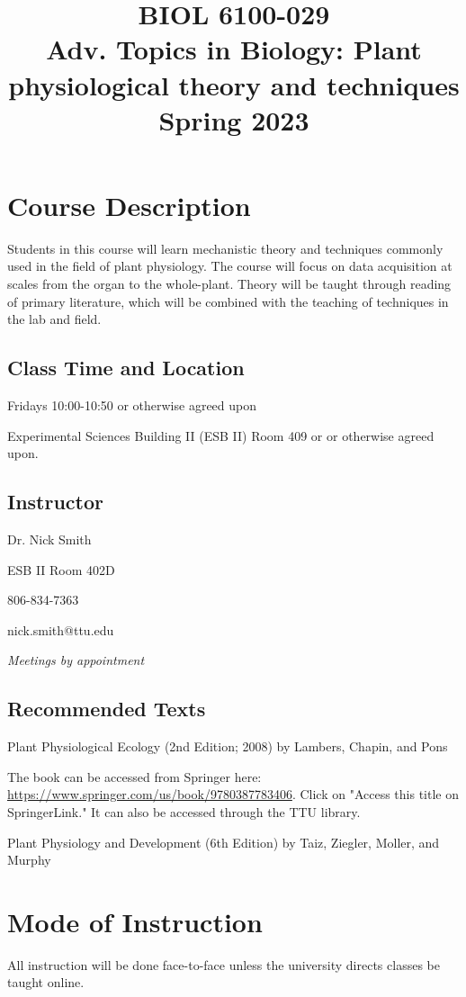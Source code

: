 \documentclass[12pt, notitlepage]{article}   	%
\title{
	\textbf{
		BIOL 6100-029
	} \\
	\large Adv. Topics in Biology: Plant physiological theory and techniques \\
	\large Spring 2023
}
\date{\vspace{-5ex}}
\begin{document}
{\selectfont %

\maketitle

\section{Course Description}
Students in this course will learn mechanistic theory and techniques commonly used in
the field of plant physiology. The course will focus on data acquisition at scales from
the organ to the whole-plant. Theory will be taught through reading of primary literature,
which will be combined with the teaching of techniques in the lab and field.

\subsection{Class Time and Location}
Fridays 10:00-10:50 or otherwise agreed upon

Experimental Sciences Building II (ESB II) Room 409 or 
or otherwise agreed upon.

\subsection{Instructor}
Dr. Nick Smith \par
ESB II Room 402D \par
806-834-7363 \par
nick.smith@ttu.edu \par
\textit{Meetings by appointment}

\subsection{Recommended Texts}
Plant Physiological Ecology (2nd Edition; 2008) by Lambers, Chapin, and Pons \par
The book can be accessed from Springer here: 
\url{https://www.springer.com/us/book/9780387783406}. Click on "Access this title on 
SpringerLink." It can also be accessed through the TTU library. \par
Plant Physiology and Development (6th Edition) by Taiz, Ziegler, Moller, and Murphy

\section{Mode of Instruction}
All instruction will be done face-to-face unless the university directs classes be 
taught online.

}
\end{document}
